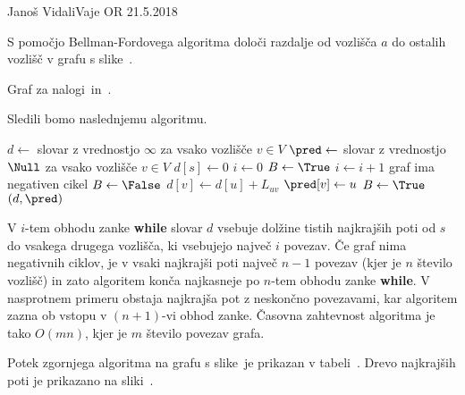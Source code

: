 \begin{naloga}{Janoš Vidali}{Vaje OR 21.5.2018}
\begin{vprasanje}
S pomočjo Bellman-Fordovega algoritma
določi razdalje od vozlišča $a$ do ostalih vozlišč
v grafu s slike~\fig.

\begin{slika}
\pgfslika
\caption{Graf za nalogi~\nal in~\nal[fw].}
\end{slika}
\end{vprasanje}

\begin{odgovor}
Sledili bomo naslednjemu algoritmu.
\begin{small}
\begin{algorithmic}
    \State $d \gets$ slovar z vrednostjo $\infty$ za vsako vozlišče $v \in V$
    \State $\pred \gets$ slovar z vrednostjo $\Null$
        za vsako vozlišče $v \in V$
    \State $d[s] \gets 0$
    \State $i \gets 0$
    \State $B \gets \True$
        \State $i \gets i+1$
            \State \Return graf ima negativen cikel
        \EndIf
        \State $B \gets \False$
                \State $d[v] \gets d[u] + L_{uv}$
                \State $\pred[v] \gets u$
                \State $B \gets \True$
            \EndIf
        \EndFor
    \EndWhile
    \State \Return $(d, \pred)$
\EndFunction
\end{algorithmic}
\end{small}
V $i$-tem obhodu zanke {\bf while}
slovar $d$ vsebuje dolžine tistih najkrajših poti
od $s$ do vsakega drugega vozlišča,
ki vsebujejo največ $i$ povezav.
Če graf nima negativnih ciklov,
je v vsaki najkrajši poti največ $n-1$ povezav
(kjer je $n$ število vozlišč)
in zato algoritem konča najkasneje po $n$-tem obhodu zanke {\bf while}.
V nasprotnem primeru obstaja najkrajša pot z neskončno povezavami,
kar algoritem zazna ob vstopu v $(n+1)$-vi obhod zanke.
Časovna zahtevnost algoritma je tako $O(mn)$,
kjer je $m$ število povezav grafa.

Potek zgornjega algoritma na grafu s slike~\fig je prikazan v tabeli~\tab.
Drevo najkrajših poti je prikazano na sliki~\fig[bf-resitev].


\end{odgovor}
\end{naloga}
